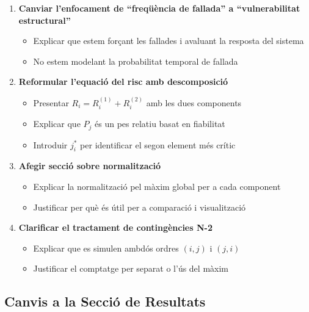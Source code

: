 \documentclass[11pt,a4paper]{article}
\begin{document}
\begin{enumerate}
    \item \textbf{Canviar l'enfocament de ``freqüència de fallada'' a ``vulnerabilitat estructural''}
    \begin{itemize}
        \item Explicar que estem forçant les fallades i avaluant la resposta del sistema
        \item No estem modelant la probabilitat temporal de fallada
    \end{itemize}
    
    \item \textbf{Reformular l'equació del risc amb descomposició}
    \begin{itemize}
        \item Presentar $R_i = R_i^{(1)} + R_i^{(2)}$ amb les dues components
        \item Explicar que $P_j$ és un pes relatiu basat en fiabilitat
        \item Introduir $j^*_i$ per identificar el segon element més crític
    \end{itemize}
    
    \item \textbf{Afegir secció sobre normalització}
    \begin{itemize}
        \item Explicar la normalització pel màxim global per a cada component
        \item Justificar per què és útil per a comparació i visualització
    \end{itemize}
    
    \item \textbf{Clarificar el tractament de contingències N-2}
    \begin{itemize}
        \item Explicar que es simulen ambdós ordres $(i,j)$ i $(j,i)$
        \item Justificar el comptatge per separat o l'ús del màxim
    \end{itemize}
\end{enumerate}

\subsection{Canvis a la Secció de Resultats}
\end{document}
